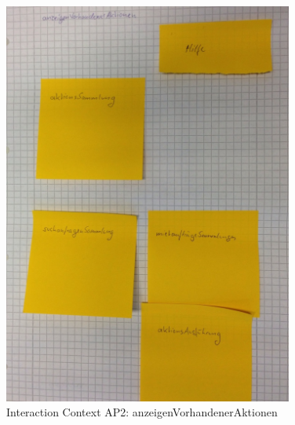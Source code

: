\begin{figure}[H]
\centering
\includegraphics[angle=90, width=0.85\textwidth] {./images/abstract/version2/anzeigenVorhandenerAktionen.JPG}
\caption{Interaction Context AP2: anzeigenVorhandenerAktionen}
\label{interfaceContents42}
\end{figure}

